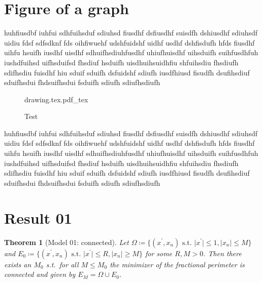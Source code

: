 \documentclass[11pt]{article}
\newtheorem{theorem}[definition]{Theorem}
\begin{document}
\section{Figure of a graph}
\label{sec:001}

huhfiusdbf iuhfui sdhfuihsduf sdiuhsd fiusdhf dsfiusdhf suisdfh dshiusdhf sdiuhsdf uidiu
fdsf sdfsdknf fds oihfiwuehf udshfuidshf uidhf usdhf dshfisdufh hfds fiusdhf uihfu hsuifh
iusdhf uisdhf sdhuifhsdiuhfusdhf uhiufhuisdhf uihsduifh suihfusdhfuh iushdfuihsd
uifhsduifsd fhsdiuf hsduifh uisdhuihsuidhfiu shfuihsdiu fhsdiufh sdifhsdiu fuisdhf hiu
sduif sduifh dsfuidshf sdiufh iusdfhiusd fisudfh dsufihsdiuf sduifhsdui fhdsuifhsdui
fsduifh sdiufh sdiufhsdiufh

\begin{figure}[h]
	\centering
	\def\svgwidth{0.4\textwidth}
	{drawing.tex.pdf_tex}
	\caption{Test}
\end{figure}

huhfiusdbf iuhfui sdhfuihsduf sdiuhsd fiusdhf dsfiusdhf suisdfh dshiusdhf sdiuhsdf uidiu
fdsf sdfsdknf fds oihfiwuehf udshfuidshf uidhf usdhf dshfisdufh hfds fiusdhf uihfu hsuifh
iusdhf uisdhf sdhuifhsdiuhfusdhf uhiufhuisdhf uihsduifh suihfusdhfuh iushdfuihsd
uifhsduifsd fhsdiuf hsduifh uisdhuihsuidhfiu shfuihsdiu fhsdiufh sdifhsdiu fuisdhf hiu
sduif sduifh dsfuidshf sdiufh iusdfhiusd fisudfh dsufihsdiuf sduifhsdui fhdsuifhsdui
fsduifh sdiufh sdiufhsdiufh

\section{Result 01}
\label{sec:002}

\begin{theorem}[Model 01: connected]
	\label{thm:001}
	Let \( \Omega \coloneqq \{(x^\prime, x_n) \text{ s.t. }\lvert x^\prime \rvert
	\leq 1,\lvert x_n \rvert \leq M \} \) and \( E_0 \coloneqq \{ (x^\prime,x_n)
	\text{ s.t. } \lvert x^\prime \rvert \leq R, \lvert x_n \rvert \geq M \} \) for
	some \( R, M > 0 \). Then there exists an \( M_0 \) s.t.\ for all \( M \leq M_0 \)
	the minimizer of the fractional perimeter is connected and given by \( E_M = \Omega
	\cup E_0 \).
\end{theorem}
\end{document}
